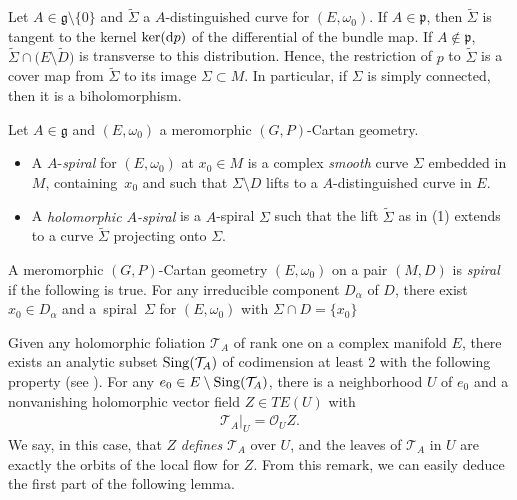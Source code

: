 \documentclass[pdftex]{sigma}
\numberwithin{equation}{section}
\begin{document}
Let $A\in \mathfrak{g}\setminus \{0\}$ and $\tilde{\Sigma}$ a $A$-distinguished curve for $(E,\omega_0)$. If $A\in \mathfrak{p}$, then $\tilde{\Sigma}$ is tangent to the kernel $\ker({\rm d}p)$ of the differential of the bundle map. If $A\not \in \mathfrak{p}$, $\tilde{\Sigma}\cap \big(E\setminus \tilde{D}\big)$ is transverse to this distribution. Hence, the restriction of $p$ to $\tilde{\Sigma}$ is a cover map from $\tilde{\Sigma}$ to its image $\Sigma\subset M$. In particular, if $\Sigma$ is simply connected, then it is a biholomorphism.

 \begin{Definition}\label{spiral} Let $A\in \mathfrak{g}$ and $(E,\omega_0)$ a meromorphic $(G,P)$-Cartan geometry.
 \begin{itemize}\itemsep=0pt
 \item[(1)] A $A$-\textit{spiral} for $(E,\omega_0)$ at $x_0 \in M$ is a complex \textit{smooth} curve $\Sigma$ embedded in $M$, containing~$x_0$ and such that $\Sigma \setminus D$ lifts to a $A$-distinguished curve in $E$.

 \item[(2)] A \textit{holomorphic $A$-spiral} is a $A$-spiral $\Sigma$ such that the lift $\tilde{\Sigma}$ as in (1) extends to a curve $\tilde{\Sigma}$ projecting onto $\Sigma$. \end{itemize}
 \end{Definition}

\begin{Definition}\label{taucondition} A meromorphic $(G,P)$-Cartan geometry $(E,\omega_0)$ on a pair $(M,D)$ is \textit{spiral} if the following is true. For any irreducible component $D_\alpha$ of $D$, there exist $x_0\in D_\alpha$ and a~spiral~$\Sigma$ for $(E,\omega_0)$ with $\Sigma \cap D = \{x_0\}$
\end{Definition}

Given any holomorphic foliation $\mathcal{T}_A$ of rank one on a complex manifold $E$, there exists an analytic subset ${\rm Sing}(\mathcal{T}_A)$ of codimension at least 2 with the following property (see \cite[p.~11]{Brunella}). For any $e_0 \in E\setminus {\rm Sing}(\mathcal{T}_A)$, there is a neighborhood $U$ of $e_0$ and a nonvanishing holomorphic vector field $Z \in TE(U)$ with
\begin{gather*}%
 \mathcal{T}_A\vert_U = \mathcal{O}_U Z.
\end{gather*}
 We say, in this case, that $Z$ \textit{defines} $\mathcal{T}_A$ over $U$, and the leaves of $\mathcal{T}_A$ in $U$ are exactly the orbits of the local flow for $Z$. From this remark, we can easily deduce the first part of the following lemma.
\end{document}

